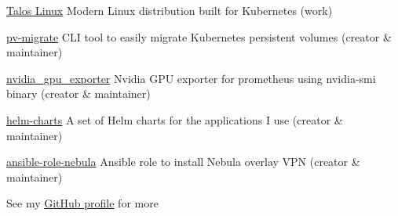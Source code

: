 
\begin{cvskills}

    \cvskill
    {\href{https://github.com/siderolabs/talos}{Talos Linux}}
    {Modern Linux distribution built for Kubernetes (work)}

    \cvskill
    {\href{https://github.com/utkuozdemir/pv-migrate}{pv-migrate}}
    {CLI tool to easily migrate Kubernetes persistent volumes (creator \& maintainer)}

    \cvskill
    {\href{https://github.com/utkuozdemir/nvidia_gpu_exporter}{nvidia\_gpu\_exporter}}
    {Nvidia GPU exporter for prometheus using nvidia-smi binary (creator \& maintainer)}

    \cvskill
    {\href{https://github.com/utkuozdemir/helm-charts}{helm-charts}}
    {A set of Helm charts for the applications I use (creator \& maintainer)}

    \cvskill
    {\href{https://github.com/utkuozdemir/ansible-role-nebula}{ansible-role-nebula}}
    {Ansible role to install Nebula overlay VPN (creator \& maintainer)}

    \cvskill
    {}
    {See my \href{https://github.com/utkuozdemir}{GitHub profile} for more}

\end{cvskills}
